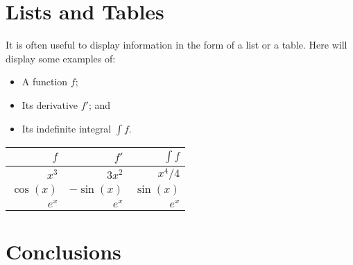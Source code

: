 \documentclass[12pt]{article}  %
\theoremstyle{definition}
\theoremstyle{remark}
\begin{document}
\section{Lists and Tables}

It is often useful to display information in the form of a list or a table.
Here will display some examples of:

\begin{itemize}
\item A function $f$;
\item Its derivative $f'$; and
\item Its indefinite integral $\int f$.
\end{itemize}

\begin{center}              %
\begin{tabular}{|r|r|r|}    %
\hline                      %
$f$ & $f'$ & $\int f$ \\    %
\hline
$x^3$ & $3x^2$ & $x^4/4$ \\
$\cos(x)$ & $-\sin(x)$ & $\sin(x)$ \\
$e^x$ & $e^x$ & $e^x$\\
\hline
\end{tabular}               %
\end{center}                %

\section{Conclusions}\label{s:conc}
\end{document}
